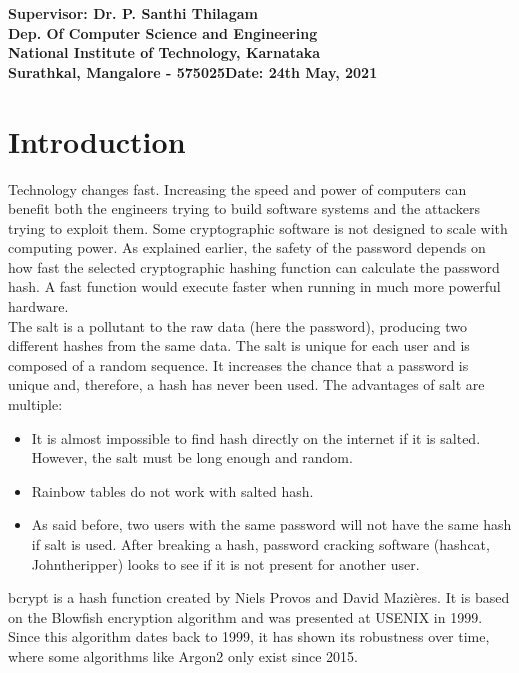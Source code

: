 \documentclass{article}[12pt,a4paper]
\begin{document}
\vspace{35em}
\textbf{Supervisor: Dr. P. Santhi Thilagam\\
Dep. Of Computer Science and Engineering\\
National Institute of Technology, Karnataka\\ 
Surathkal, Mangalore - 575025}\hspace{16em}\textbf{Date: 24th May, 2021}



\newpage
\tableofcontents
\thispagestyle{empty}
\newpage
{}

\section{Introduction}
Technology changes fast. Increasing the speed and power of computers can benefit both the engineers trying to build software systems and the attackers trying to exploit them. Some cryptographic software is not designed to scale with computing power. As explained earlier, the safety of the password depends on how fast the selected cryptographic hashing function can calculate the password hash. A fast function would execute faster when running in much more powerful hardware.\\
The salt is a pollutant to the raw data (here the password), producing two different hashes from the same data.  The salt is unique for each user and is composed of a random sequence.  It increases the chance that a password is unique and, therefore, a hash has never been used. 
The advantages of salt are multiple:
\begin{itemize}
    \item It is almost impossible to find hash directly on the internet if it is salted. However, the salt must be long enough and random.
    \item Rainbow tables do not work with salted hash.
    \item As said before, two users with the same password will not have the same hash if salt is used. After breaking a hash, password cracking software (hashcat, Johntheripper) looks to see if it is not present for another user.
\end{itemize}
bcrypt is a hash function created by Niels Provos and David Mazières. It is based on the Blowfish encryption algorithm and was presented at USENIX in 1999. 
Since this algorithm dates back to 1999, it has shown its robustness over time, where some algorithms like Argon2 only exist since 2015.
\end{document}
